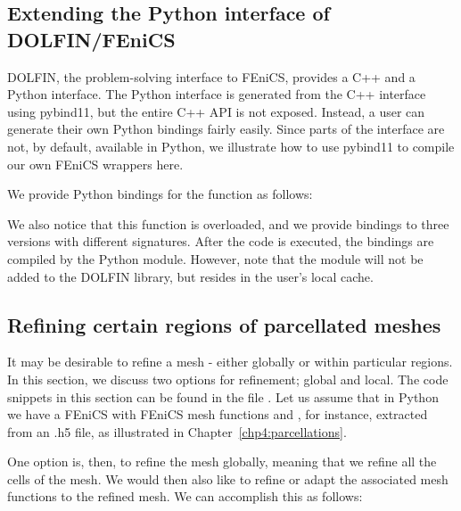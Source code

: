 \subsection{Extending the Python interface of DOLFIN/FEniCS}
DOLFIN, the problem-solving interface to FEniCS, provides a C++ and a
Python interface. The Python interface is generated from the C++
interface using pybind11, but the entire C++ API is not
exposed. Instead, a user can generate their own Python bindings fairly
easily. Since parts of the  interface are not, by
default, available in Python, we illustrate how to use pybind11 to
compile our own FEniCS wrappers here.

We provide Python bindings for the  function as follows: 
\newpage
{}

We also notice that this function is overloaded, and we provide
bindings to three versions with different signatures. After the code is
executed, the bindings are compiled by the Python module. However,
note that the module will not be added to the DOLFIN library, but
resides in the user's local cache.

\subsection{Refining certain regions of parcellated meshes}
It may be desirable to refine a mesh - either globally or within particular 
regions. In this section, we discuss two options for refinement; global and 
local. The code snippets in this section can be found in the file 
. Let us assume that 
in Python we have a FEniCS  with FEniCS mesh functions 
 and , for instance, extracted from an .h5 file, 
as illustrated in Chapter~\ref{chp4:parcellations}. 

One option is, then, to refine the mesh globally, meaning that we refine
all the cells of the mesh. We would then also like to refine or adapt the
associated mesh functions to the refined mesh. We can accomplish this
as follows:

